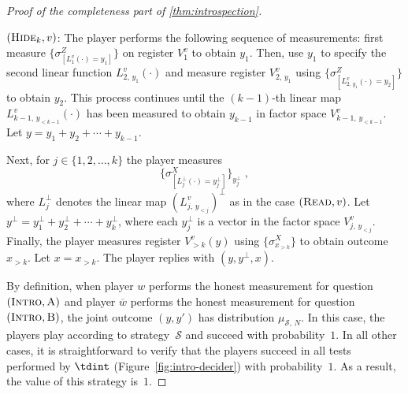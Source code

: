 \documentclass[11pt]{article}
\theoremstyle{definition}
\newcommand{\sampler}{\mathcal{S}}
\newcommand{\strategy}{\mathscr{S}}
\newcommand{\labelstyle}[1]{\ensuremath{\textsc{#1}}\xspace}
\newcommand{\trole}{\ensuremath{v}}
\newcommand{\alice}{\labelstyle{A}}
\newcommand{\bob}{\labelstyle{B}}
\newcommand{\typestyle}[1]{\ensuremath{\textsc{#1}}\xspace}
\newcommand{\Read}{\typestyle{Read}}
\newcommand{\Hide}[1]{\typestyle{Hide}_{#1}}
\newcommand{\Introspect}{\typestyle{Intro}}
\begin{document}
\begin{proof}[Proof of the completeness part of \cref{thm:introspection}]
\begin{description}
  \item $(\Hide{k}, \trole)$:
    The player performs the following sequence of measurements: first measure
    $\{ \sigma^Z_{[L^\trole_{1}(\cdot) = y_{1}]} \}$ on register $V_1^v$ to
    obtain $y_1$.
    Then, use $y_1$ to specify the second linear function
    $L^\trole_{2,\, y_1}(\cdot)$ and measure register $V^\trole_{2,\,y_1}$ using
    $\{ \sigma^Z_{[L^\trole_{2,\, y_1}(\cdot) = y_{2}]} \}$ to obtain $y_2$.
    This process continues until the $(k-1)$-th linear map $L_{k-1,\, y_{<
        k-1}}^\trole(\cdot)$ has been measured to obtain $y_{k-1}$ in factor
    space $V_{k-1,\, y_{< k-1}}^\trole$.
    Let $y = y_1 + y_2 + \cdots + y_{k-1}$.
    
    Next, for $j \in \{1, 2, \ldots, k\}$ the player measures
    \begin{equation*}
      \Big \{ \sigma^X_{[L_{j}^\perp(\cdot) = y^\perp_{j}]} \Big \}_{y^\perp_j}\;,
    \end{equation*}
    where $L_j^\perp$ denotes the linear map $(L^\trole_{j,\, y_{<j}})^\perp$ as in
    the case $(\Read, \trole)$.
    Let $y^\perp = y_1^\perp + y_2^\perp + \cdots + y_k^\perp$, where each
    $y_j^\perp$ is a vector in the factor space $V^\trole_{j,\, y_{<j}}$.
    Finally, the player measures register $V_{> k}^\trole(y)$ using
    $\{\sigma^X_{x_{>k}}\}$ to obtain outcome $x_{> k}$.
    Let $x = x_{> k}$.
    The player replies with $(y,y^\perp,x)$.
\end{description}

By definition, when player $w$ performs the honest measurement for question
$(\Introspect, \alice)$ and player $\overline{w}$ performs the honest
measurement for question $(\Introspect, \bob)$, the joint outcome $(y, y')$ has
distribution $\mu_{\sampler,\, N}$.
In this case, the players play according to strategy~$\strategy$ and succeed
with probability~$1$.
In all other cases, it is straightforward to verify that the players succeed in
all tests performed by $\tdint$ (Figure~\ref{fig:intro-decider}) with
probability~$1$.
As a result, the value of this strategy is~$1$. 


\end{proof}
\end{document}
